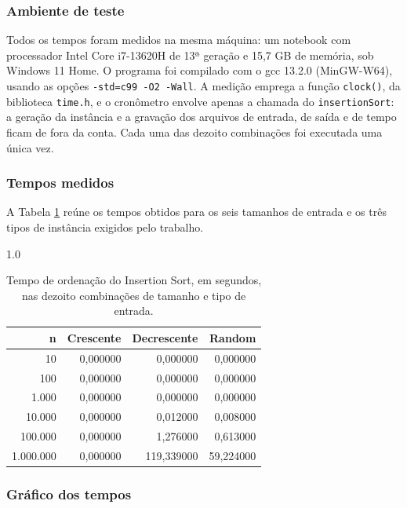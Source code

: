 \subsubsection{Ambiente de teste}

\indent \qquad Todos os tempos foram medidos na mesma máquina: um notebook com
processador Intel Core i7-13620H de 13ª geração e 15,7 GB de memória, sob
Windows 11 Home. O programa foi compilado com o gcc 13.2.0 (MinGW-W64), usando
as opções \texttt{-std=c99 -O2 -Wall}. A medição emprega a função
\texttt{clock()}, da biblioteca \texttt{time.h}, e o cronômetro envolve apenas a
chamada do \texttt{insertionSort}: a geração da instância e a gravação dos
arquivos de entrada, de saída e de tempo ficam de fora da conta. Cada uma das
dezoito combinações foi executada uma única vez.

\subsubsection{Tempos medidos}

\indent \qquad A Tabela \ref{tab:tempos_insertion} reúne os tempos obtidos para
os seis tamanhos de entrada e os três tipos de instância exigidos pelo trabalho.

\begin{spacing}{1.0}
	\begin{table}[H]
		\centering
		\caption{Tempo de ordenação do Insertion Sort, em segundos, nas dezoito combinações de tamanho e tipo de entrada.}
		\label{tab:tempos_insertion}
		\renewcommand{\arraystretch}{1.2}
		\begin{tabular}{rrrr}
			\toprule
			\textbf{n} & \textbf{Crescente} & \textbf{Decrescente} & \textbf{Random} \\
			\midrule
			10 & 0,000000 & 0,000000 & 0,000000 \\
			100 & 0,000000 & 0,000000 & 0,000000 \\
			1.000 & 0,000000 & 0,000000 & 0,000000 \\
			10.000 & 0,000000 & 0,012000 & 0,008000 \\
			100.000 & 0,000000 & 1,276000 & 0,613000 \\
			1.000.000 & 0,000000 & 119,339000 & 59,224000 \\
			\bottomrule
		\end{tabular}
	\end{table}
\end{spacing}

\subsubsection{Gráfico dos tempos}

